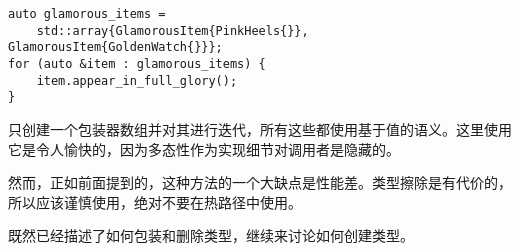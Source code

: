 \begin{lstlisting}[style=styleCXX]
auto glamorous_items =
	std::array{GlamorousItem{PinkHeels{}}, GlamorousItem{GoldenWatch{}}};
for (auto &item : glamorous_items) {
	item.appear_in_full_glory();
}
\end{lstlisting}

只创建一个包装器数组并对其进行迭代，所有这些都使用基于值的语义。这里使用它是令人愉快的，因为多态性作为实现细节对调用者是隐藏的。

然而，正如前面提到的，这种方法的一个大缺点是性能差。类型擦除是有代价的，所以应该谨慎使用，绝对不要在热路径中使用。

既然已经描述了如何包装和删除类型，继续来讨论如何创建类型。

















